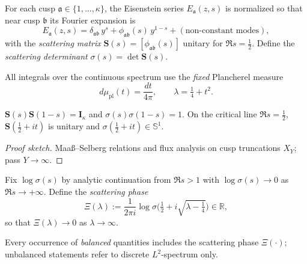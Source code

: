 \begin{definition}
\label{def:eisenstein-part1}
For each cusp $\mathfrak a\in\{1,\ldots,\kappa\}$, the Eisenstein series $E_{\mathfrak a}(z,s)$ is normalized so that near cusp $\mathfrak b$ its Fourier expansion is
\[
  E_{\mathfrak a}(z,s)=\delta_{\mathfrak a\mathfrak b}\,y^s+\phi_{\mathfrak a\mathfrak b}(s)\,y^{1-s}+(\text{non-constant modes}),
\]
with the \emph{scattering matrix} $\mathbf S(s)=[\phi_{\mathfrak a\mathfrak b}(s)]$ unitary for $\Re s=\tfrac12$. Define the \emph{scattering determinant} $\sigma(s)=\det \mathbf S(s)$.
\end{definition}

\begin{definition}
\label{def:plancherel-part1}
All integrals over the continuous spectrum use the \emph{fixed} Plancherel measure
\[
  d\mu_{\mathrm{pl}}(t)=\frac{dt}{4\pi},\qquad \lambda=\tfrac14+t^2.
\]
\end{definition}

\begin{lemma}
\label{lem:unitarity-s-part1}
$\mathbf S(s)\mathbf S(1-s)=\mathbf I_\kappa$ and $\sigma(s)\sigma(1-s)=1$. On the critical line $\Re s=\tfrac12$, $\mathbf S(\tfrac12+it)$ is unitary and $\sigma(\tfrac12+it)\in \mathbb S^1$.
\end{lemma}

\begin{proof}[Proof sketch]
Maaß--Selberg relations and flux analysis on cusp truncations $X_Y$; pass $Y\to\infty$.
\end{proof}

\begin{definition}
\label{def:branch-part1}
Fix $\log\sigma(s)$ by analytic continuation from $\Re s>1$ with $\log\sigma(s)\to 0$ as $\Re s\to +\infty$. Define the \emph{scattering phase}
\[
  \Xi(\lambda):=\frac{1}{2\pi i}\log \sigma\!\Big(\tfrac12+i\sqrt{\lambda-\tfrac14}\Big)\in\mathbb R,
\]
so that $\Xi(\lambda)\to 0$ as $\lambda\to\infty$.
\end{definition}

\begin{remark}
\label{rem:balanced-bookkeeping-part1}
Every occurrence of \emph{balanced} quantities includes the scattering phase $\Xi(\cdot)$; unbalanced statements refer to discrete $L^2$-spectrum only.
\end{remark}

